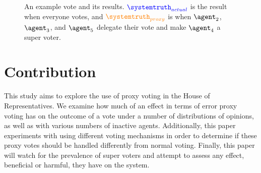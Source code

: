 \begin{figure}[htbp]
    \centering

    \caption{
        An example vote and its results.
        $\textcolor{blue}{\systemtruth_{actual}}$ is the result when everyone votes,
        and $\textcolor{orange}{\systemtruth_{proxy}}$ is when $\agent_2$, $\agent_3$,
        and $\agent_5$ delegate their vote and make $\agent_4$ a super voter.
    }
    \label{fig:voting-example}
\end{figure}


\section{Contribution}\label{sec:contribution}
This study aims to explore the use of proxy voting in the House of Representatives.
We examine how much of an effect in terms of error proxy voting has on the outcome
of a vote under a number of distributions of opinions, as well as with various
numbers of inactive agents.
Additionally, this paper experiments with using different voting mechanisms in order
to determine if these proxy votes should be handled differently from normal voting.
Finally, this paper will watch for the prevalence of super voters and attempt to
assess any effect, beneficial or harmful, they have on the system.

